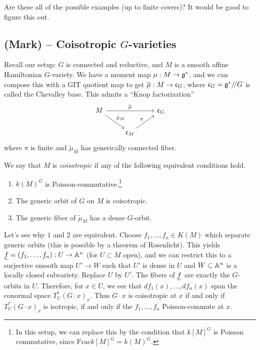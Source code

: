 \documentclass{article}
\begin{document}
Are these all of the possible examples (up to finite covers)?
It would be good to figure this out.

\subsection{(Mark) -- Coisotropic $G$-varieties}

Recall our setup: $G$ is connected and reductive, and $M$ is a smooth affine Hamiltonian $G$-variety.
We have a moment map $\mu: M \to \gf^*$, and we can compose this with a GIT quotient map to get $\ol{\mu}: M \to \cf_G$, where $\cf_G = \gf^* \sslash G$ is called the Chevalley base.
This admits a ``Knop factorization''
\[
\begin{tikzcd}
	M \ar[rr, "\ol{\mu}"] \ar[dr, "\tilde{\mu}_M"] & & \cf_G \\
	& \cf_M \ar[ur, "\pi"] &
\end{tikzcd}
\]
where $\pi$ is finite and $\tilde{\mu}_M$ has generically connected fiber.

\begin{dfn}
	We say that $M$ is \emph{coisotropic} if any of the following equivalent conditions hold.
	\begin{enumerate}
		\item $k(M)^G$ is Poisson-commutative.\footnote{In this setup, we can replace this by the condition that $k[M]^G$ is Poisson commutative, since $\mathrm{Frac} k[M]^G = k(M)^G$.}
		\item The generic orbit of $G$ on $M$ is coisotropic.
		\item The generic fiber of $\tilde{\mu}_M$ has a dense $G$-orbit.
	\end{enumerate}
\end{dfn}

Let's see why $1$ and $2$ are equivalent.
Choose $f_1, \dots, f_n \in K(M)$ which separate generic orbits (this is possible by a theorem of Rosenlicht).
This yields $\ul{f} = (f_1, \dots, f_n): U \to \AA^n$ (for $U \subset M$ open), and we can restrict this to a surjective smooth map $U' \to W$  such that $U'$ is dense in $U$ and $W \subset \AA^n$ is a locally closed subvariety.
Replace $U$ by $U'$.
The fibers of $\ul{f}$ are exactly the $G$-orbits in $U$.
Therefore, for $x \in U$, we see that $df_1(x), \dots, df_n(x)$ span the conormal space $T^*_U(G \cdot x)_x$.
Thus $G \cdot x$ is coisotropic at $x$ if and only if $T_U^*(G \cdot x)_x$ is isotropic, if and only if the $f_1, \dots, f_n$ Poisson-commute at $x$.
\end{document}
